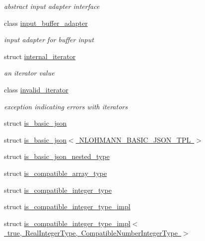 \begin{DoxyCompactItemize}
\begin{DoxyCompactList}\small\item\em abstract input adapter interface \end{DoxyCompactList}\item 
class \mbox{\hyperlink{classnlohmann_1_1detail_1_1input__buffer__adapter}{input\+\_\+buffer\+\_\+adapter}}
\begin{DoxyCompactList}\small\item\em input adapter for buffer input \end{DoxyCompactList}\item 
struct \mbox{\hyperlink{structnlohmann_1_1detail_1_1internal__iterator}{internal\+\_\+iterator}}
\begin{DoxyCompactList}\small\item\em an iterator value \end{DoxyCompactList}\item 
class \mbox{\hyperlink{classnlohmann_1_1detail_1_1invalid__iterator}{invalid\+\_\+iterator}}
\begin{DoxyCompactList}\small\item\em exception indicating errors with iterators \end{DoxyCompactList}\item 
struct \mbox{\hyperlink{structnlohmann_1_1detail_1_1is__basic__json}{is\+\_\+basic\+\_\+json}}
\item 
struct \mbox{\hyperlink{structnlohmann_1_1detail_1_1is__basic__json_3_01_n_l_o_h_m_a_n_n___b_a_s_i_c___j_s_o_n___t_p_l_01_4}{is\+\_\+basic\+\_\+json$<$ N\+L\+O\+H\+M\+A\+N\+N\+\_\+\+B\+A\+S\+I\+C\+\_\+\+J\+S\+O\+N\+\_\+\+T\+P\+L $>$}}
\item 
struct \mbox{\hyperlink{structnlohmann_1_1detail_1_1is__basic__json__nested__type}{is\+\_\+basic\+\_\+json\+\_\+nested\+\_\+type}}
\item 
struct \mbox{\hyperlink{structnlohmann_1_1detail_1_1is__compatible__array__type}{is\+\_\+compatible\+\_\+array\+\_\+type}}
\item 
struct \mbox{\hyperlink{structnlohmann_1_1detail_1_1is__compatible__integer__type}{is\+\_\+compatible\+\_\+integer\+\_\+type}}
\item 
struct \mbox{\hyperlink{structnlohmann_1_1detail_1_1is__compatible__integer__type__impl}{is\+\_\+compatible\+\_\+integer\+\_\+type\+\_\+impl}}
\item 
struct \mbox{\hyperlink{structnlohmann_1_1detail_1_1is__compatible__integer__type__impl_3_01true_00_01_real_integer_type78b0ba77f36a8c8169cdb79b01d1a4bf}{is\+\_\+compatible\+\_\+integer\+\_\+type\+\_\+impl$<$ true, Real\+Integer\+Type, Compatible\+Number\+Integer\+Type $>$}}

\end{DoxyCompactItemize}
